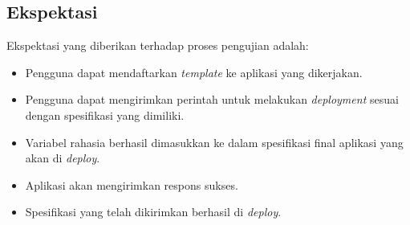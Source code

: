 \subsection{Ekspektasi}
Ekspektasi yang diberikan terhadap proses pengujian adalah:
\begin{itemize}
    \item Pengguna dapat mendaftarkan \textit{template} ke aplikasi yang dikerjakan.
    \item Pengguna dapat mengirimkan perintah untuk melakukan \textit{deployment} sesuai dengan spesifikasi yang dimiliki.
    \item Variabel rahasia berhasil dimasukkan ke dalam spesifikasi final aplikasi yang akan di \textit{deploy}.
    \item Aplikasi akan mengirimkan respons sukses.
    \item Spesifikasi yang telah dikirimkan berhasil di \textit{deploy}.
\end{itemize}
